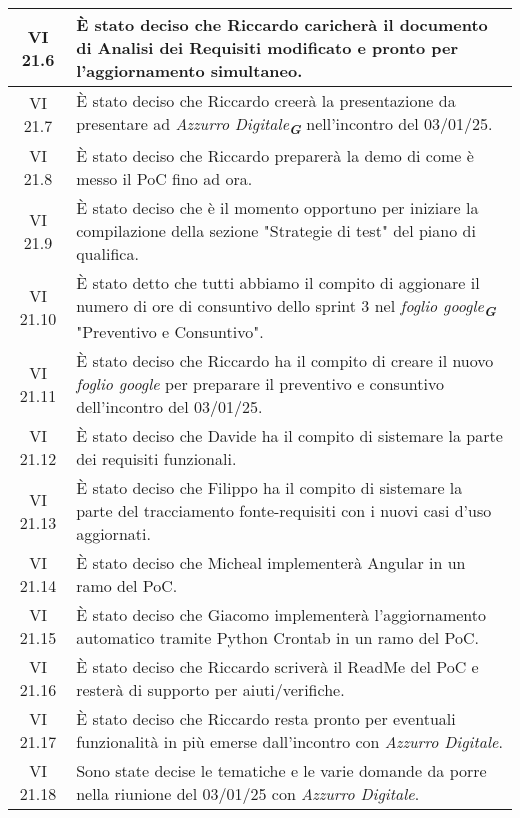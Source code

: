 \begin{table}[htbp]
\begin{tabular}{|c|p{}|}
        \hline
        VI 21.6 & È stato deciso che Riccardo caricherà il documento di Analisi dei Requisiti modificato e pronto per l'aggiornamento simultaneo.\\
        \hline    
        VI 21.7 & È stato deciso che Riccardo creerà la presentazione da presentare ad \emph{Azzurro Digitale}\textsubscript{\textit{\textbf{G}}} nell'incontro del 03/01/25. \\
        \hline 
        VI 21.8 & È stato deciso che Riccardo preparerà la demo di come è messo il PoC fino ad ora. \\
        \hline 
        VI 21.9 & È stato deciso che è il momento opportuno per iniziare la compilazione della sezione "Strategie di test" del piano di qualifica. \\
        \hline 
        VI 21.10 & È stato detto che tutti abbiamo il compito di aggionare il numero di ore di consuntivo dello sprint 3 nel \emph{foglio google}\textsubscript{\textit{\textbf{G}}} "Preventivo e Consuntivo". \\
        \hline 
        VI 21.11 & È stato deciso che Riccardo ha il compito di creare il nuovo \emph{foglio google} per preparare il preventivo e consuntivo dell'incontro del 03/01/25.\\
        \hline
        VI 21.12 & È stato deciso che Davide ha il compito di sistemare la parte dei requisiti funzionali.\\
        \hline  
        VI 21.13 & È stato deciso che Filippo ha il compito di sistemare la parte del tracciamento fonte-requisiti con i nuovi casi d'uso aggiornati.\\
        \hline  
        VI 21.14 & È stato deciso che Micheal implementerà Angular in un ramo del PoC.\\
        \hline  
        VI 21.15 & È stato deciso che Giacomo implementerà l'aggiornamento automatico tramite Python Crontab in un ramo del PoC.\\
        \hline  
        VI 21.16 & È stato deciso che Riccardo scriverà il ReadMe del PoC e resterà di supporto per aiuti/verifiche. \\
        \hline  
        VI 21.17 & È stato deciso che Riccardo resta pronto per eventuali funzionalità in più emerse dall'incontro con \emph{Azzurro Digitale}.\\
        \hline  
        VI 21.18 & Sono state decise le tematiche e le varie domande da porre nella riunione del 03/01/25 con \emph{Azzurro Digitale}.\\
        \hline
          

    \end{tabular}
\end{table}

